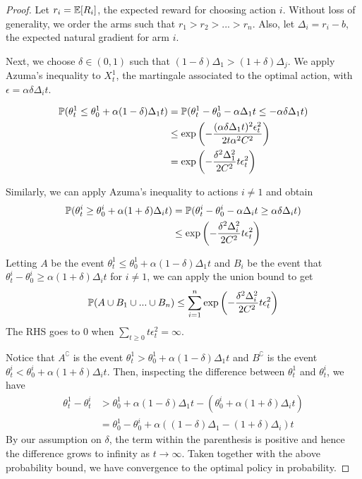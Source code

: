 \begin{proof}
Let $r_i = \mathbb{E} [R_i]$, the expected reward for choosing action $i$.
Without loss of generality, we order the arms such that $r_1 > r_2 > ... > r_n$. 
Also, let $\Delta_i = r_i - b$, the expected natural gradient for arm $i$. 

Next, we choose $\delta \in (0,1)$ such that $(1-\delta) \Delta_1 > (1+\delta) \Delta_j$.
We apply Azuma's inequality to $X^1_t$, the martingale associated to the optimal action, with $\epsilon = \alpha \delta \Delta_i t$.

\begin{align*}
    {\mathbb{P}}(\theta_t^1 \le \theta_0^1 + \alpha (1-\delta) \Delta_1 t  )
    &= {\mathbb{P}}(\theta_t^1 - \theta_0^1 - \alpha \Delta_1 t  \le -\alpha \delta \Delta_1 t  )\\
    &\le \exp \left(- \frac{(\alpha \delta \Delta_1 t)^2 \epsilon_t^2}{2t \alpha^2 C^2}  \right) \\ 
    &= \exp \left(- \frac{ \delta^2 \Delta_1^2 }{2 C^2} t \epsilon_t^2 \right) \\
\end{align*}

Similarly, we can apply Azuma's inequality to actions $i \neq 1$ and obtain
\begin{align*}
    {\mathbb{P}}(\theta_t^i \ge \theta_0^i + \alpha (1 + \delta) \Delta_i t  ) 
    &= {\mathbb{P}}(\theta_t^i - \theta_0^i - \alpha \Delta_i t  \ge \alpha \delta \Delta_i t  )\\ 
    &\le \exp \left(- \frac{ \delta^2 \Delta_i^2 }{2 C^2} t \epsilon_t^2 \right)
\end{align*}

Letting $A$ be the event $\theta_t^1 \le \theta_0^1 + \alpha (1-\delta) \Delta_1 t$ and $B_i$ be the event that $\theta_t^i - \theta_0^i \ge \alpha (1 + \delta) \Delta_i t $ for $i \neq 1$, we can apply the union bound to get 
\[ {\mathbb{P}} (A \cup B_1 \cup ... \cup B_n) \le \sum_{i=1}^n  \exp \left(- \frac{ \delta^2 \Delta_i^2 }{2 C^2} t \epsilon_t^2 \right) \]
The RHS goes to $0$ when $\sum_{t\ge 0} t \epsilon_t^2 = \infty$. 

Notice that $A^\complement$ is the event $\theta_t^1 > \theta_0^1 + \alpha (1-\delta) \Delta_1 t$ and $B^\complement$ is the event $\theta_t^i < \theta_0^i + \alpha (1 + \delta) \Delta_i t$. 
Then, inspecting the difference between $\theta^1_t$ and $\theta^i_t$, we have
\begin{align*}
    \theta_t^1 - \theta_t^i &> \theta_0^1 + \alpha (1-\delta) \Delta_1 t - (\theta_0^i + \alpha (1 + \delta) \Delta_i t) \\
    &= \theta_0^1 - \theta_0^i  + \alpha ( (1-\delta) \Delta_1 - (1 + \delta) \Delta_i) t 
\end{align*}
By our assumption on $\delta$, the term within the parenthesis is positive and hence the difference grows to infinity as $t \xrightarrow{} \infty$.
Taken together with the above probability bound, we have convergence to the optimal policy in probability.




\end{proof}

